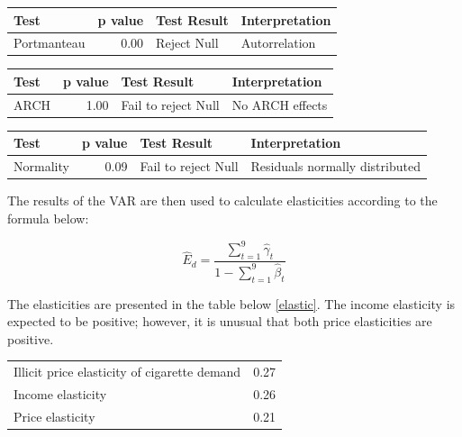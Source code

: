 \documentclass[11pt,preprint, authoryear]{elsarticle}
\let\origtable\table
\let\endorigtable\endtable
\renewenvironment{table}[1][2] {
    \expandafter\origtable\expandafter[H]
} {
    \endorigtable
}
\numberwithin{equation}{section}
\numberwithin{figure}{section}
\numberwithin{table}{section}
\begin{document}
\begin{table}[H]
\centering
\begin{tabular}{lrll}
  \hline
Test & p value & Test Result & Interpretation \\ 
  \hline
Portmanteau & 0.00 & Reject Null & Autorrelation \\ 
   \hline
\end{tabular}
\caption{Serial Correlcation Test \label{diagvar}} 
\end{table}
\begin{table}[H]
\centering
\begin{tabular}{lrll}
  \hline
Test & p value & Test Result & Interpretation \\ 
  \hline
ARCH & 1.00 & Fail to reject Null & No ARCH effects \\ 
   \hline
\end{tabular}
\caption{ARCH Tests \label{archh}} 
\end{table}
\begin{table}[H]
\centering
\begin{tabular}{lrll}
  \hline
Test & p value & Test Result & Interpretation \\ 
  \hline
Normality & 0.09 & Fail to reject Null & Residuals normally distributed \\ 
   \hline
\end{tabular}
\caption{Normality Tests \label{archhvar}} 
\end{table}

The results of the VAR are then used to calculate elasticities according
to the formula below:

\begin{equation}
\hat{E}_{d}=\frac{\sum_{t=1}^{9} \hat{\gamma}_{t}}{1-\sum_{t=1}^{9} \hat{\beta}_{t}}
\end{equation}

The elasticities are presented in the table below \ref{elastic}. The
income elasticity is expected to be positive; however, it is unusual
that both price elasticities are positive.

\begin{table}[H]
\centering
\begin{tabular}{lr}
  \hline
  \hline
Illicit price elasticity of cigarette demand & 0.27 \\ 
  Income elasticity & 0.26 \\ 
  Price elasticity & 0.21 \\ 
   \hline
\end{tabular}
\caption{Elasticities \label{elastic}} 
\end{table}
\end{document}
